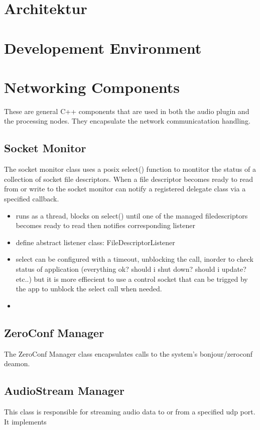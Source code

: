 \section{Architektur}

\section{Developement Environment}

\section{Networking Components}

These are general C++ components that are used in both the audio plugin and the processing nodes. They encapsulate the network communicatation handling.

\subsection{Socket Monitor}

The socket monitor class uses a posix select() function to montitor the status of a collection of socket file descriptors. When a file descriptor becomes ready to read from or write to the socket monitor can notify a registered delegate class via a specified callback.

\begin{itemize}

\item runs as a thread, blocks on select() until one of the managed filedescriptors becomes ready to read then notifies corresponding listener

\item define abstract listener class: FileDescriptorListener
\item select can be configured with a timeout, unblocking the call, inorder to check status of application (everything ok? should i shut down? should i update? etc..) but it is more effiecient to use a control socket that can be trigged by the app to unblock the select call when needed.
\item


\end{itemize}

\subsection{ZeroConf Manager}

The ZeroConf Manager class encapsulates calls to the system's bonjour/zeroconf deamon.

\subsection{AudioStream Manager}

This class is responsible for streaming audio data to or from a specified udp port. It implements